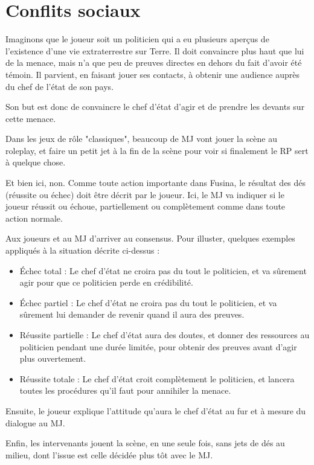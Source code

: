 \section{Conflits sociaux}

Imaginons que le joueur soit un politicien qui a eu plusieurs aperçus de l'existence d'une vie extraterrestre sur Terre. Il doit convaincre plus haut que lui de la menace, mais n'a que peu de preuves directes en dehors du fait d'avoir été témoin. Il parvient, en faisant jouer ses contacts, à obtenir une audience auprès du chef de l'état de son pays.

Son but est donc de convaincre le chef d'état d'agir et de prendre les devants sur cette menace. 

Dans les jeux de rôle "classiques", beaucoup de MJ vont jouer la scène au roleplay, et faire un petit jet à la fin de la scène pour voir si finalement le RP sert à quelque chose.

Et bien ici, non. Comme toute action importante dans Fusina, le résultat des dés (réussite ou échec) doit être décrit par le joueur. Ici, le MJ va indiquer si le joueur réussit ou échoue, partiellement ou complètement comme dans toute action normale.

Aux joueurs et au MJ d'arriver au consensus. Pour illuster, quelques exemples appliqués à la situation décrite ci-dessus :

\begin{itemize}
\item Échec total : Le chef d'état ne croira pas du tout le politicien, et va sûrement agir pour que ce politicien perde en crédibilité.
\item Échec partiel : Le chef d'état ne croira pas du tout le politicien, et va sûrement lui demander de revenir quand il aura des preuves.
\item Réussite partielle : Le chef d'état aura des doutes, et donner des ressources au politicien pendant une durée limitée, pour obtenir des preuves avant d'agir plus ouvertement.
\item Réussite totale : Le chef d'état croit complètement le politicien, et lancera toutes les procédures qu'il faut pour annihiler la menace.
\end{itemize}

Ensuite, le joueur explique l'attitude qu'aura le chef d'état au fur et à mesure du dialogue au MJ.

Enfin, les intervenants jouent la scène, en une seule fois, sans jets de dés au milieu, dont l'issue est celle décidée plus tôt avec le MJ.

